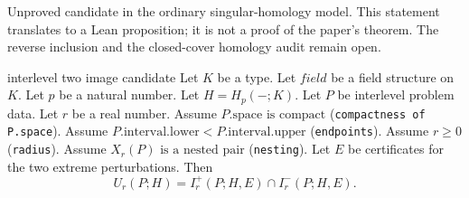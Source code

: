 Unproved candidate in the ordinary singular-homology model.
This statement translates to a Lean proposition; it is not a proof of the paper's theorem.
The reverse inclusion and the closed-cover homology audit remain open.
\par

\begin{cleanresult}{interlevel two image candidate}
Let $K$ be a type.
Let $\mathit{field}$ be a field structure on $K$.
Let $p$ be a natural number.
Let $H = H_{p}(-;K)$.
Let $P$ be interlevel problem data.
Let $r$ be a real number.
Assume $P.\mathrm{space}\text{ is compact}$ (\texttt{compactness of P.space}).
Assume $P.\mathrm{interval}.\mathrm{lower}< P.\mathrm{interval}.\mathrm{upper}$ (\texttt{endpoints}).
Assume $r\ge 0$ (\texttt{radius}).
Assume $X_{r}(P)\text{ is a nested pair}$ (\texttt{nesting}).
Let $E$ be certificates for the two extreme perturbations.
Then \[U_{r}(P;H)=I^+_{r}(P;H,E)\cap I^-_{r}(P;H,E).\]
\par{}
\end{cleanresult}

